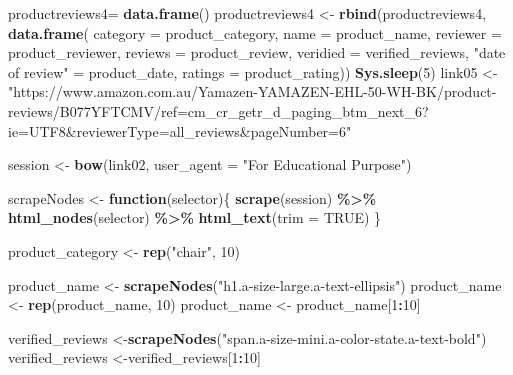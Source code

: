 \documentclass[
]{article}
\newenvironment{Shaded}{\begin{snugshade}}{\end{snugshade}}
\newcommand{\AttributeTok}[1]{\textcolor[rgb]{0.13,0.29,0.53}{#1}}
\newcommand{\ConstantTok}[1]{\textcolor[rgb]{0.56,0.35,0.01}{#1}}
\newcommand{\ControlFlowTok}[1]{\textcolor[rgb]{0.13,0.29,0.53}{\textbf{#1}}}
\newcommand{\DecValTok}[1]{\textcolor[rgb]{0.00,0.00,0.81}{#1}}
\newcommand{\FunctionTok}[1]{\textcolor[rgb]{0.13,0.29,0.53}{\textbf{#1}}}
\newcommand{\NormalTok}[1]{#1}
\newcommand{\OtherTok}[1]{\textcolor[rgb]{0.56,0.35,0.01}{#1}}
\newcommand{\SpecialCharTok}[1]{\textcolor[rgb]{0.81,0.36,0.00}{\textbf{#1}}}
\newcommand{\StringTok}[1]{\textcolor[rgb]{0.31,0.60,0.02}{#1}}
\begin{document}
\begin{Shaded}
\begin{Highlighting}[]
\NormalTok{  productreviews4}\OtherTok{=} \FunctionTok{data.frame}\NormalTok{()}
\NormalTok{  productreviews4 }\OtherTok{\textless{}{-}} \FunctionTok{rbind}\NormalTok{(productreviews4, }\FunctionTok{data.frame}\NormalTok{(}
                      \AttributeTok{category =}\NormalTok{ product\_category,}
                      \AttributeTok{name =}\NormalTok{ product\_name,}
                      \AttributeTok{reviewer =}\NormalTok{ product\_reviewer,}
                      \AttributeTok{reviews =}\NormalTok{ product\_review,}
                      \AttributeTok{veridied =}\NormalTok{ verified\_reviews,}
                      \StringTok{"date of review"} \OtherTok{=}\NormalTok{ product\_date,}
                      \AttributeTok{ratings =}\NormalTok{ product\_rating))}
   \FunctionTok{Sys.sleep}\NormalTok{(}\DecValTok{5}\NormalTok{)}
\NormalTok{link05 }\OtherTok{\textless{}{-}} \StringTok{"https://www.amazon.com.au/Yamazen{-}YAMAZEN{-}EHL{-}50{-}WH{-}BK/product{-}reviews/B077YFTCMV/ref=cm\_cr\_getr\_d\_paging\_btm\_next\_6?ie=UTF8\&reviewerType=all\_reviews\&pageNumber=6"}


\NormalTok{  session }\OtherTok{\textless{}{-}} \FunctionTok{bow}\NormalTok{(link02,}
               \AttributeTok{user\_agent =} \StringTok{"For Educational Purpose"}\NormalTok{)}

\NormalTok{  scrapeNodes }\OtherTok{\textless{}{-}} \ControlFlowTok{function}\NormalTok{(selector)\{}
    \FunctionTok{scrape}\NormalTok{(session) }\SpecialCharTok{\%\textgreater{}\%}
      \FunctionTok{html\_nodes}\NormalTok{(selector) }\SpecialCharTok{\%\textgreater{}\%}
      \FunctionTok{html\_text}\NormalTok{(}\AttributeTok{trim =} \ConstantTok{TRUE}\NormalTok{)}
\NormalTok{  \}}

\NormalTok{  product\_category }\OtherTok{\textless{}{-}} \FunctionTok{rep}\NormalTok{(}\StringTok{"chair"}\NormalTok{, }\DecValTok{10}\NormalTok{)}

\NormalTok{  product\_name }\OtherTok{\textless{}{-}} \FunctionTok{scrapeNodes}\NormalTok{(}\StringTok{"h1.a{-}size{-}large.a{-}text{-}ellipsis"}\NormalTok{)}
\NormalTok{  product\_name }\OtherTok{\textless{}{-}} \FunctionTok{rep}\NormalTok{(product\_name, }\DecValTok{10}\NormalTok{)}
\NormalTok{  product\_name }\OtherTok{\textless{}{-}}\NormalTok{ product\_name[}\DecValTok{1}\SpecialCharTok{:}\DecValTok{10}\NormalTok{]}
  
\NormalTok{  verified\_reviews }\OtherTok{\textless{}{-}}\FunctionTok{scrapeNodes}\NormalTok{(}\StringTok{"span.a{-}size{-}mini.a{-}color{-}state.a{-}text{-}bold"}\NormalTok{)}
\NormalTok{  verified\_reviews }\OtherTok{\textless{}{-}}\NormalTok{verified\_reviews[}\DecValTok{1}\SpecialCharTok{:}\DecValTok{10}\NormalTok{]}
  

\end{Highlighting}
\end{Shaded}
\end{document}
